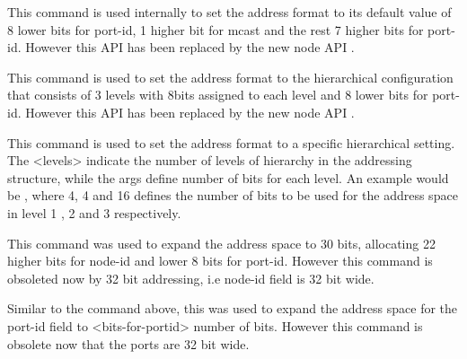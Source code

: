 This command is used internally to set the address format to its default value
of 8 lower bits for port-id, 1 higher bit for mcast and the rest 7 higher bits
for port-id. However this API has been replaced by the new node API
.


This command is used to set the address format to the hierarchical configuration
that consists of 3 levels with 8bits assigned to each level and 8 lower bits
for port-id. However this API has been replaced by the new node API
.


This command is used to set the address format to a specific hierarchical
setting. The <levels> indicate the number of levels of hierarchy in the addressing
structure, while the args define number of bits for each level. An example
would be  , where 4, 4 and
16 defines the number of bits to be used for the address space in level 1 , 2
and 3 respectively.


This command was used to expand the address space to 30 bits, allocating
22 higher bits for node-id and lower 8 bits for port-id. However this command
is obsoleted now by 32 bit addressing, i.e node-id field is 32 bit wide.


Similar to the command above, this was used to expand the address space for
the port-id field to <bits-for-portid> number of bits. However this command
is obsolete now that the ports are 32 bit wide.

\endinput





